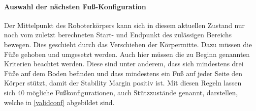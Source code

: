 \paragraph{Auswahl der nächsten Fuß-Konfiguration}

Der Mittelpunkt des Roboterkörpers kann sich in diesem aktuellen Zustand nur noch vom zuletzt berechneten Start- und Endpunkt des zulässigen Bereichs bewegen. Dies geschieht durch das Verschieben der Körpermitte. Dazu müssen die Füße gehoben und umgesetzt werden. Auch hier müssen die zu Beginn genannten Kriterien beachtet werden. Diese sind unter anderem, dass sich mindestens drei Füße auf dem Boden befinden und dass mindestens ein Fuß auf jeder Seite den Körper stützt, damit der Stability Margin positiv ist. Mit diesen Regeln lassen sich 40 mögliche Fußkonfigurationen, auch Stützzustände genannt, darstellen, welche in \autoref{validconf} abgebildet sind.


